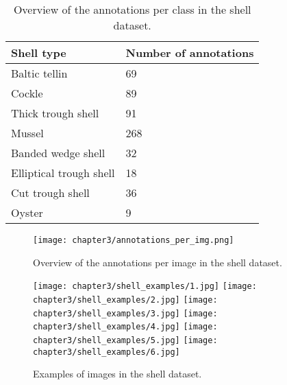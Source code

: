 \begin{table}[H]
    \centering
    \captionsetup{justification=centering}
    \begin{tabular}{|l|l|}
    \hline
    \textbf{Shell type} & \textbf{Number of annotations} \\ \hline
    Baltic tellin       & 69                             \\ \hline
    Cockle              & 89                             \\ \hline
    Thick trough shell  & 91                             \\ \hline
    Mussel              & 268                            \\ \hline
    Banded wedge shell  & 32                             \\ \hline
    Elliptical trough shell & 18                         \\ \hline
    Cut trough shell    & 36                             \\ \hline
    Oyster              & 9                              \\ \hline
    \end{tabular}
    \caption{Overview of the annotations per class in the shell dataset.}
    \label{tab:shell_annotations}
\end{table}

\begin{figure}[H]
    \centering
    \texttt{[image: chapter3/annotations\_per\_img.png]}
    \caption{Overview of the annotations per image in the shell dataset.}
    \label{fig:annotations_per_img}
\end{figure}

\begin{figure}[H]
    \centering
    \captionsetup{justification=centering}
    \texttt{[image: chapter3/shell\_examples/1.jpg]} 
    \texttt{[image: chapter3/shell\_examples/2.jpg]} 
    \texttt{[image: chapter3/shell\_examples/3.jpg]}
    \texttt{[image: chapter3/shell\_examples/4.jpg]} 
    \texttt{[image: chapter3/shell\_examples/5.jpg]} 
    \texttt{[image: chapter3/shell\_examples/6.jpg]}
       
    \caption{Examples of images in the shell dataset.}
    \label{tab:shell_examples}
\end{figure}


